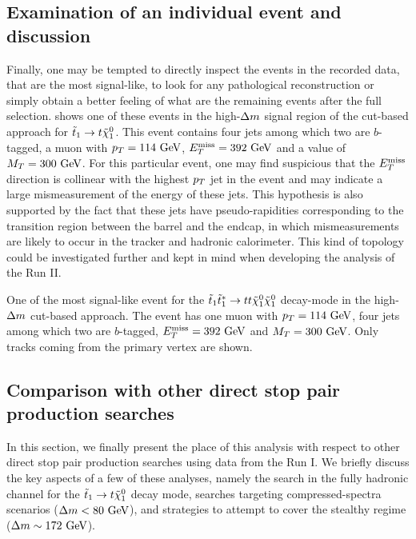     \subsection{Examination of an individual event and discussion}

    Finally, one may be tempted to directly inspect the events in the recorded
    data, that are the most signal-like, to look for any pathological
    reconstruction or simply obtain a better feeling of what are the remaining
    events after the full selection.  shows one of
    these events in the high-$\Delta m$ signal region of the cut-based approach
    for $\tilde{t}_1 \rightarrow t \tilde{\chi}_1^0$. This event contains four jets among
    which two are $b$-tagged, a muon with $p_T = 114~\text{GeV}$, $E_T^\text{miss} = 392~\text{GeV}$ and
    a value of $M_T = 300~\text{GeV}$. For this particular event, one may find
    suspicious that the $E_T^\text{miss}$ direction is collinear with the highest $p_T$ jet
    in the event and may indicate a large mismeasurement of the energy of these
    jets. This hypothesis is also supported by the fact that these jets have
    pseudo-rapidities corresponding to the transition region between the barrel
    and the endcap, in which mismeasurements are likely to occur in the tracker
    and hadronic calorimeter. This kind of topology could be investigated
    further and kept in mind when developing the analysis of the Run II.

     {One of the most signal-like event for the
    $\tilde{t}_1 \tilde{t}_1^{*} \rightarrow t t \tilde{\chi}_1^0 \tilde{\chi}_1^0$ decay-mode in
    the high-$\Delta m$ cut-based approach. The event has one muon with $p_T =
    114~\text{GeV}$, four jets among which two are $b$-tagged, $E_T^\text{miss} = 392~\text{GeV}$ and
    $M_T = 300 ~\text{GeV}$.  Only tracks coming from the primary vertex are shown.}

    \newpage

    \subsection{Comparison with other direct stop pair production searches}

    In this section, we finally present the place of this analysis with respect
    to other direct stop pair production searches using data from the Run I. We
    briefly discuss the key aspects of a few of these analyses, namely the
    search in the fully hadronic channel for the $\tilde{t}_1 \rightarrow t
    \tilde{\chi}_1^0$ decay mode, searches targeting compressed-spectra scenarios
    ($\Delta m < 80~\text{GeV}$), and strategies to attempt to cover the stealthy regime
    ($\Delta m \sim 172~\text{GeV}$).

